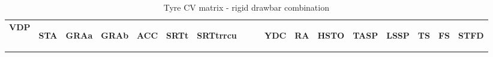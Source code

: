 \begin{table}[H]
\centering\scriptsize
\caption{Tyre CV matrix - rigid drawbar combination}   
\label{table:tyre-cv-rigid-drawbar}%
\begin{tabular}{|l|c|c|c|c|c|c|c|c|c|c|c|c|c|c|}

\hline
\multicolumn{1}{|c|}{\textbf{VDP}} & \begin{sideways}\textbf{STA}\end{sideways} & \begin{sideways}\textbf{GRAa}\end{sideways} & \begin{sideways}\textbf{GRAb}\end{sideways} & \begin{sideways}\textbf{ACC}\end{sideways} & \begin{sideways}\textbf{SRTt}\end{sideways} & \begin{sideways}\textbf{SRTtrrcu~~~~}\end{sideways} & \begin{sideways}\textbf{YDC}\end{sideways} & \begin{sideways}\textbf{RA}\end{sideways} & \begin{sideways}\textbf{HSTO}\end{sideways} & \begin{sideways}\textbf{TASP}\end{sideways} & \begin{sideways}\textbf{LSSP}\end{sideways} & \begin{sideways}\textbf{TS}\end{sideways} & \begin{sideways}\textbf{FS}\end{sideways} & \begin{sideways}\textbf{STFD}\end{sideways} \bigstrut \\


\end{tabular}
\end{table}
